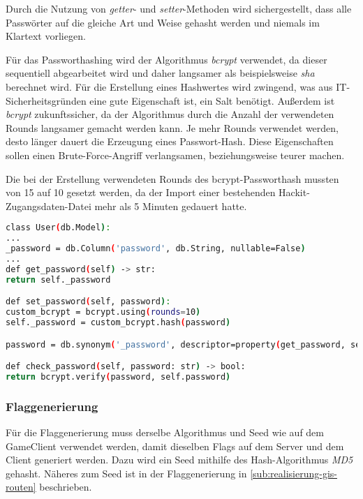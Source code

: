 Durch die Nutzung von \textit{getter}- und \textit{setter}-Methoden wird sichergestellt, dass alle Passwörter auf die gleiche Art und Weise gehasht werden und niemals im Klartext vorliegen.

Für das Passworthashing wird der Algorithmus \textit{bcrypt} verwendet, da dieser sequentiell abgearbeitet wird und daher langsamer als beispielsweise  \textit{sha} berechnet wird. Für die Erstellung eines Hashwertes wird zwingend, was aus IT-Sicherheitsgründen eine gute Eigenschaft ist, ein Salt benötigt. Außerdem ist \textit{bcrypt} zukunftssicher, da der Algorithmus durch die Anzahl der verwendeten Rounds langsamer gemacht werden kann. Je mehr Rounds verwendet werden, desto länger dauert die Erzeugung eines Passwort-Hash. Diese Eigenschaften sollen einen Brute-Force-Angriff verlangsamen, beziehungsweise teurer machen. \cite{ariasHashingActionUnderstanding2018}

Die bei der Erstellung verwendeten Rounds des bcrypt-Passworthash mussten von 15 auf 10 gesetzt werden, da der Import einer bestehenden Hackit-Zugangsdaten-Datei mehr als 5 Minuten gedauert hatte.

\begin{lstlisting}[language=bash, frame=single, caption={GIS Passwort des Accounts}, captionpos=b, label={lst:gis-orm-user-pw-hash}]
class User(db.Model):
...
_password = db.Column('password', db.String, nullable=False)
...
def get_password(self) -> str:
return self._password

def set_password(self, password):
custom_bcrypt = bcrypt.using(rounds=10)
self._password = custom_bcrypt.hash(password)

password = db.synonym('_password', descriptor=property(get_password, set_password))

def check_password(self, password: str) -> bool:
return bcrypt.verify(password, self.password)
\end{lstlisting}

\subsubsection{Flaggenerierung}\label{subsub:realisierung-gis-flag-hash}
Für die Flaggenerierung muss derselbe Algorithmus und Seed wie auf dem GameClient verwendet werden, damit dieselben Flags auf dem Server und dem Client generiert werden. Dazu wird ein Seed mithilfe des Hash-Algorithmus \textit{MD5} gehasht. Näheres zum Seed ist in der Flaggenerierung in \autoref{sub:realisierung-gis-routen} beschrieben. 

